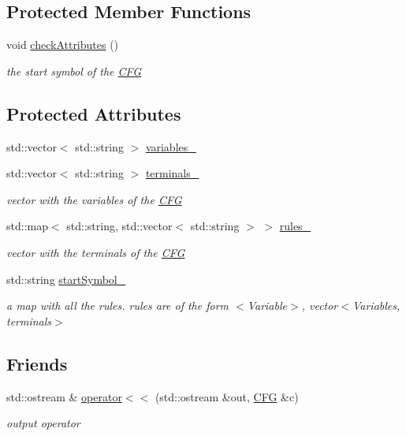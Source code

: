 \subsection*{\-Protected \-Member \-Functions}
\begin{DoxyCompactItemize}
\item 
void \hyperlink{classCFG_a20c962c9056a1770d71f9610df8db905}{check\-Attributes} ()
\begin{DoxyCompactList}\small\item\em the start symbol of the \hyperlink{classCFG}{\-C\-F\-G} \end{DoxyCompactList}\end{DoxyCompactItemize}
\subsection*{\-Protected \-Attributes}
\begin{DoxyCompactItemize}
\item 
std\-::vector$<$ std\-::string $>$ \hyperlink{classCFG_a7369373d17b20520d7b72d43f471cda9}{variables\-\_\-}
\item 
std\-::vector$<$ std\-::string $>$ \hyperlink{classCFG_ac105b578d6237fc6ff28e54c98bbb1b8}{terminals\-\_\-}
\begin{DoxyCompactList}\small\item\em vector with the variables of the \hyperlink{classCFG}{\-C\-F\-G} \end{DoxyCompactList}\item 
std\-::map$<$ std\-::string, \*
std\-::vector$<$ std\-::string $>$ $>$ \hyperlink{classCFG_a6f148c60599eec412d168d2353b7b814}{rules\-\_\-}
\begin{DoxyCompactList}\small\item\em vector with the terminals of the \hyperlink{classCFG}{\-C\-F\-G} \end{DoxyCompactList}\item 
std\-::string \hyperlink{classCFG_a21527e2ffbb0b5bf8995ebae725858eb}{start\-Symbol\-\_\-}
\begin{DoxyCompactList}\small\item\em a map with all the rules. rules are of the form $<$\-Variable$>$, vector$<$\-Variables, terminals$>$ \end{DoxyCompactList}\end{DoxyCompactItemize}
\subsection*{\-Friends}
\begin{DoxyCompactItemize}
\item 
std\-::ostream \& \hyperlink{classCFG_a125cf827399aa731591064e741ab8fb7}{operator$<$$<$} (std\-::ostream \&out, \hyperlink{classCFG}{\-C\-F\-G} \&c)
\begin{DoxyCompactList}\small\item\em output operator \end{DoxyCompactList}\end{DoxyCompactItemize}


